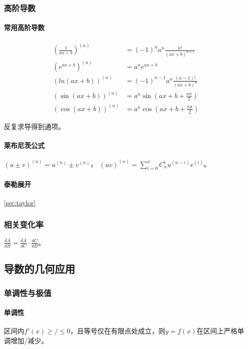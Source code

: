 \documentclass[
12pt, %
a4paper, 
oneside, %
headinclude,footinclude, %
]{scrartcl}
\begin{document}
\subsubsection{高阶导数}
\paragraph{常用高阶导数}
\begin{align*}
(\frac{1}{ax + b})^{(n)} &= (-1)^n a^n \frac{n!}{(ax + b)^{n + 1}} \\
(e^{ax + b})^{(n)} &= a^n e^{ax + b} \\
(ln(ax + b))^{(n)} &= (-1)^{n - 1} a^n \frac{(n - 1)!}{(ax + b)^n} \\
(\sin(ax + b))^{(n)} &= a^n \sin(ax + b + \frac{n\pi}{2}) \\
(\cos(ax + b))^{(n)} &= a^n \cos(ax + b + \frac{n\pi}{2})
\end{align*}

反复求导得到通项。
\paragraph{莱布尼茨公式}
$ (u \pm v)^{(n)} = u^{(n)} \pm v^{(n)} $，
$ (uv)^{(n)} = \sum_{i = 0}^n C_n^i u^{(n - i)}v^{(i)} $。
\paragraph{泰勒展开}\ref{sec:taylor}
\subsubsection{相关变化率}
$ \frac{dA}{dB} = \frac{dA}{dC} \cdot \frac{dC}{dB} $。
\subsection{导数的几何应用}
\subsubsection{单调性与极值}
\paragraph{单调性}
区间内$ f'(x) \geq/\leq 0 $，且等号仅在有限点处成立，则$ y = f(x) $在区间上严格单调增加/减少。
\end{document}
